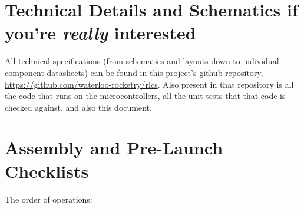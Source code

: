 \documentclass[letter]{article}
\begin{document}

\section{Technical Details and Schematics if you're \textit{really} interested}

All technical specifications (from schematics and layouts down to individual
component datasheets) can be found in this project's github repository,
\url{https://github.com/waterloo-rocketry/rlcs}. Also present in that repository
is all the code that runs on the microcontrollers, all the unit tests that that
code is checked against, and also this document.

\section{Assembly and Pre-Launch Checklists}
The order of operations:
\end{document}
